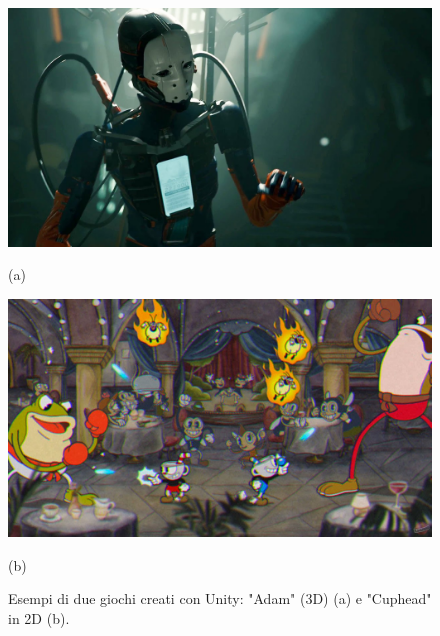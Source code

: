 \begin{figure}[H]
	\centering
	\begin{minipage}[b]{0.49\textwidth}
		\includegraphics[width=\textwidth]{figure/Adam}
		{\footnotesize \centerline{(a)} \par}
	\end{minipage}
	\hfill
	\begin{minipage}[b]{0.49\textwidth}
		\includegraphics[width=\textwidth]{figure/Cuphead}
		{\footnotesize \centerline{(b)} \par}
	\end{minipage}
	\caption{Esempi di due giochi creati con Unity: "Adam" (3D) \cite{UnityAdam} (a) e "Cuphead" in 2D \cite{Cuphead} (b).}
\end{figure}

